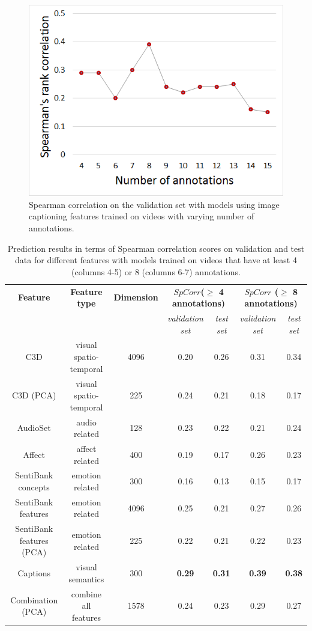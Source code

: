 \documentclass[sigconf]{acmart}
\begin{document}
\begin{figure}[h]	  
	\centering
	\includegraphics[width=0.7\columnwidth]{figures/annotations_modelling.png}
	\caption{Spearman correlation on the validation set with models using image captioning features trained on videos with varying number of annotations.}
	\label{num-ann}
\end{figure}

\begin{table}
	\centering
	\renewcommand{\arraystretch}{1.2}
	\begin{tabular}{|c|c|c|c|c|c|c|}
		\hline
		\textbf{Feature} & \textbf{Feature type}& \textbf{Dimension}& \multicolumn{2}{c|}{\textbf{$SpCorr$($\geq$ 4 annotations)}} & \multicolumn{2}{c|}{\textbf{$SpCorr$ ($\geq$ 8 annotations)}}\\
		\cline{4-7}
		& & & \emph{validation set}& \emph{test set} & \emph{validation set}& \emph{test set}\\ \hline
		C3D& visual spatio-temporal& 4096& 0.20& 0.26& 0.31& 0.34\\ \hline
		C3D (PCA)& visual spatio-temporal & 225& 0.24& 0.21& 0.18& 0.17\\ \hline
		AudioSet& audio related& 128& 0.23& 0.22& 0.21& 0.24\\ \hline
		Affect& affect related& 400& 0.19& 0.17& 0.26& 0.23\\ \hline
		SentiBank concepts& emotion related& 300& 0.16& 0.13& 0.15& 0.17\\ \hline
		SentiBank features& emotion related& 4096& 0.25& 0.21& 0.27& 0.26\\ \hline
		SentiBank features (PCA)& emotion related & 225& 0.22& 0.21& 0.22& 0.23\\ \hline
		Captions& visual semantics & 300& \textbf{0.29}& \textbf{0.31}& \textbf{0.39}& \textbf{0.38} \\ \hline
		Combination (PCA)& combine all features & 1578& 0.24& 0.23& 0.29& 0.27\\ \hline		
	\end{tabular}
	\caption{Prediction results in terms of Spearman correlation scores on validation and test data for different features with models trained on videos that have at least 4 (columns 4-5) or 8 (columns 6-7) annotations.}
	\label{res-4-10-ann}	
\end{table}
\end{document}
